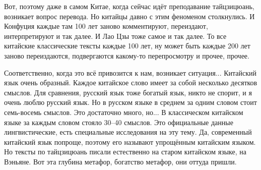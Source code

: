 Вот, поэтому даже в самом 
Китае, когда сейчас идёт преподавание тайцзицюань,  
возникает вопрос перевода. Но китайцы давно с этим 
феноменом столкнулись.  И Конфуция каждые там 100 лет 
заново комментируют,  переиздают,  интерпретируют и 
так далее. И Лао Цзы тоже самое и так далее. То все 
китайские классические тексты каждые 100 лет, ну может 
быть каждые 200 лет заново переиздаются, подвергаются 
какому-то перепросмотру и прочее, прочее.  

Соответственно,  когда это всё привозится к нам,  
возникает ситуация... Китайский язык очень 
образный.  Каждое китайское слово имеет за собой 
несколько десятков смыслов.  Для сравнения, русский 
язык тоже богатый язык, никто не спорит, и я очень 
люблю русский язык. Но в русском языке в среднем за 
одним словом стоит семь-восемь смыслов. Это 
достаточно много, но...  В классическом китайском языке 
за каждым словом стояло 30--40 смыслов.  Это официальные 
данные лингвистические, есть специальные 
исследования на эту тему. Да, современный китайский 
язык попроще,  поэтому его называют упрощённым 
китайским языком.  Но тексты по тайцзицюань писали 
естественно на старом китайском языке, на Вэньяне.  Вот эта 
глубина метафор, богатство метафор,  они оттуда 
пришли.

